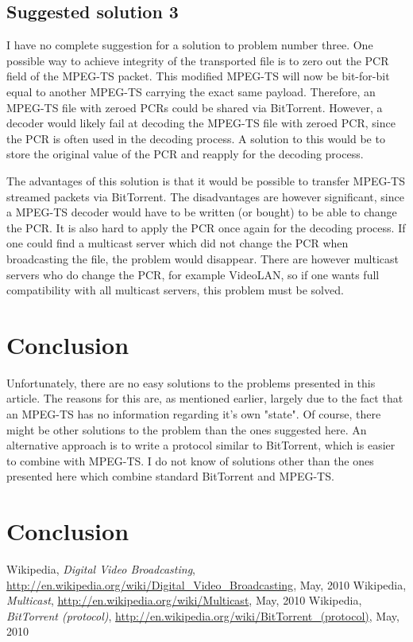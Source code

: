 \documentclass[11pt,oneside,a4paper,onecolumn]{article}
\begin{document}
\subsection{Suggested solution 3}
I have no complete suggestion for a solution to problem number three. One possible way to achieve integrity of the transported file is to 
zero out the PCR field of the MPEG-TS packet. This modified MPEG-TS will now be bit-for-bit equal to another MPEG-TS carrying the exact same
payload. Therefore, an MPEG-TS file with zeroed PCRs could be shared via BitTorrent. However, a decoder would likely fail at decoding the MPEG-TS file
with zeroed PCR, since the PCR is often used in the decoding process. A solution to this would be to store the original value of the PCR and reapply 
for the decoding process.

The advantages of this solution is that it would be possible to transfer MPEG-TS streamed packets via BitTorrent. The disadvantages are however
significant, since a MPEG-TS decoder would have to be written (or bought) to be able to change the PCR. It is also hard to apply the PCR once again
for the decoding process. If one could find a multicast server which did not change the PCR when broadcasting the file, the problem would disappear. 
There are however multicast servers who do change the PCR, for example VideoLAN, so if one wants full compatibility with all multicast
servers, this problem must be solved.

\section{Conclusion}
Unfortunately, there are no easy solutions to the problems presented in this article. The reasons for this are, as mentioned earlier, largely due to
the fact that an MPEG-TS has no information regarding it's own "state". Of course, there might be other solutions to the problem than the ones suggested
here. An alternative approach is to write a protocol similar to BitTorrent, which is easier to combine with MPEG-TS. I do not know of solutions
other than the ones presented here which combine standard BitTorrent and MPEG-TS.


\section{Conclusion}

\begin{thebibliography}{9}
    Wikipedia,
    \emph{Digital Video Broadcasting},
    \url{http://en.wikipedia.org/wiki/Digital_Video_Broadcasting},
    May, 2010
    Wikipedia,
    \emph{Multicast},
    \url{http://en.wikipedia.org/wiki/Multicast},
    May, 2010
    Wikipedia,
    \emph{BitTorrent (protocol)},
    \url{http://en.wikipedia.org/wiki/BitTorrent_(protocol)},
    May, 2010
\end{thebibliography}
\end{document}
